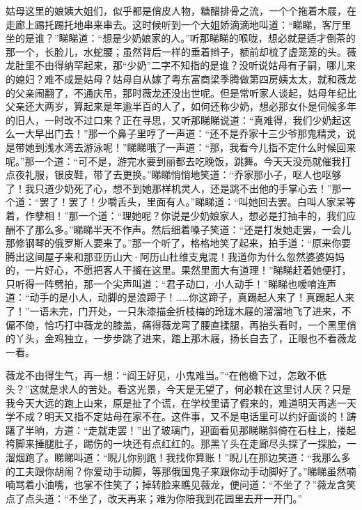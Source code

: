 \par 姑母这里的娘姨大姐们，似乎都是俏皮人物，糖醋排骨之流，一个个拖着木屐，在走廊上踢托踢托地串来串去。这时候听到一个大姐娇滴滴地叫道：“睇睇，客厅里坐的是谁？”睇睇道：“想是少奶娘家的人。”听那睇睇的喉咙，想必就是适才倒茶的那一个，长脸儿，水蛇腰；虽然背后一样的垂着辫子，额前却梳了虚笼笼的头。薇龙肚里不由得纳罕起来，那“少奶”二字不知指的是谁？没听说姑母有子嗣，哪儿来的媳妇？难不成是姑母？姑母自从嫁了粤东富商梁季腾做第四房姨太太，就和薇龙的父亲闹翻了，不通庆吊，那时薇龙还没出世呢。但是常听家人谈起，姑母年纪比父亲还大两岁，算起来是年逾半百的人了，如何还称少奶，想必那女仆是伺候多年的旧人，一时改不过口来？正在寻思，又听那睇睇说道：“真难得，我们少奶起这么一大早出门去！”那一个鼻子里哼了一声道：“还不是乔家十三少爷那鬼精灵，说是带她到浅水湾去游泳呢！”睇睇哦了一声道：“那，我看今儿指不定什么时候回来呢。”那一个道：“可不是，游完水要到丽都去吃晚饭，跳舞。今天天没亮就催我打点夜礼服，银皮鞋，带了去更换。”睇睇悄悄地笑道：“乔家那小子，呕人也呕够了！我只道少奶死了心，想不到她那样机灵人，还是跳不出他的手掌心去！”那一个道：“罢了！罢了！少嚼舌头，里面有人。”睇睇道：“叫她回去罢。白叫人家呆等着，作孽相！”那一个道：“理她呢？你说是少奶娘家人，想必是打抽丰的，我们应酬不了那么多。”睇睇半天不作声。然后细着嗓子笑道：“还是打发她走罢，一会儿那修钢琴的俄罗斯人要来了。”那一个听了，格格地笑了起来，拍手道：“原来你要腾出这间屋子来和那亚历山大·阿历山杜维支鬼混！我道你为什么忽然婆婆妈妈的，一片好心，不愿把客人干搁在这里。果然里面大有道理！”睇睇赶着她便打，只听得一阵劈拍，那一个尖声叫道：“君子动口，小人动手！”睇睇也嗳唷连声道：“动手的是小人，动脚的是浪蹄子！……你这蹄子，真踢起人来了！真踢起人来了！”一语未完，门开处，一只朱漆描金折枝梅的玲珑木屐的溜溜地飞了进来，不偏不倚，恰巧打中薇龙的膝盖，痛得薇龙弯了腰直揉腿，再抬头看时，一个黑里俏的丫头，金鸡独立，一步步跳了进来，踏上那木屐，扬长自去了，正眼也不看薇龙一看。
\par 薇龙不由得生气，再一想：“阎王好见，小鬼难当。”“在他檐下过，怎敢不低头？”这就是求人的苦处。看这光景，今天是无望了，何必赖在这里讨人厌？只是我今天大远的跑上山来，原是扯了个谎，在学校里请了假来的，难道明天再逃一天学不成？明天又指不定姑母在家不在。这件事，又不是电话里可以约好面谈的！踌躇了半晌，方道：“走就走罢！”出了玻璃门，迎面看见那睇睇斜倚在石柱上，搂起袴脚来捶腿肚子，踢伤的一块还有点红红的。那黑丫头在走廊尽头探了一探脸，一溜烟跑了。睇睇叫道：“睨儿你别跑！我找你算账！”睨儿在那边笑道：“我那么多的工夫跟你胡闹？你爱动手动脚，等那俄国鬼子来跟你动手动脚好了。”睇睇虽然喃喃骂着小油嘴，也掌不住笑了；掉转脸来瞧见薇龙，便问道：“不坐了？”薇龙含笑点了点头道：“不坐了，改天再来；难为你陪我到花园里去开一开门。”
